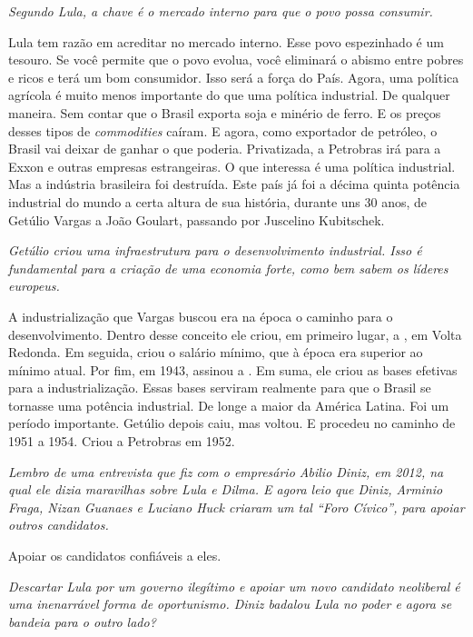 \itshape
 Segundo Lula, a chave é o mercado interno para que o
povo possa consumir.

\normalfont 
Lula tem razão em acreditar no mercado interno. Esse povo
espezinhado é um tesouro. Se você permite que o povo evolua, você
eliminará o abismo entre pobres e ricos e terá um bom consumidor. Isso
será a força do País. Agora, uma política agrícola é muito menos
importante do que uma política industrial. De qualquer maneira. Sem
contar que o Brasil exporta soja e minério de ferro. E os preços desses
tipos de \emph{commodities} caíram. E agora, como exportador de
petróleo, o Brasil vai deixar de ganhar o que poderia. Privatizada, a
Petrobras irá para a Exxon e outras empresas estrangeiras. O que
interessa é uma política industrial. Mas a indústria brasileira foi
destruída. Este país já foi a décima quinta potência industrial do mundo
a certa altura de sua história, durante uns 30 anos, de Getúlio Vargas a
João Goulart, passando por Juscelino Kubitschek.

\itshape
 Getúlio criou uma infraestrutura para o desenvolvimento
industrial. Isso é fundamental para a criação de uma economia forte,
como bem sabem os líderes europeus.

\normalfont 
A industrialização que Vargas buscou era na época o
caminho para o desenvolvimento. Dentro desse conceito ele criou, em
primeiro lugar, a , em Volta Redonda. Em seguida, criou o salário
mínimo, que à época era superior ao mínimo atual. Por fim, em 1943,
assinou a . Em suma, ele criou as bases efetivas para a
industrialização. Essas bases serviram realmente para que o Brasil se
tornasse uma potência industrial. De longe a maior da América Latina.
Foi um período importante. Getúlio depois caiu, mas voltou. E procedeu
no caminho de 1951 a 1954. Criou a Petrobras em 1952.

\itshape
 Lembro de uma entrevista que fiz com o empresário
Abilio Diniz, em 2012, na qual ele dizia maravilhas sobre Lula e Dilma.
E agora leio que Diniz, Arminio Fraga, Nizan Guanaes e Luciano Huck
criaram um tal ``Foro Cívico'', para apoiar outros candidatos.

\normalfont 
Apoiar os candidatos confiáveis a eles.

\itshape
 Descartar Lula por um governo ilegítimo e apoiar um
novo candidato neoliberal é uma inenarrável forma de oportunismo. Diniz
badalou Lula no poder e agora se bandeia para o outro lado?

